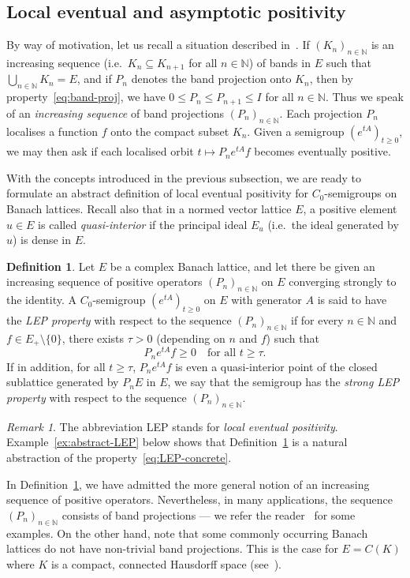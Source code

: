 \documentclass[a4paper, reqno]{amsart}
\numberwithin{equation}{section}
\theoremstyle{plain}
\theoremstyle{definition}
\newtheorem{definition}[theorem]{Definition}
\theoremstyle{remark}
\newtheorem{remark}[theorem]{Remark}
\newcommand{\NN}{\mathbb{N}}
\begin{document}
\subsection{Local eventual and asymptotic positivity}
By way of motivation, let us recall a situation described in~\cite[Section 7]{Ar21}. If $(K_n)_{n\in\NN}$ is an increasing sequence (i.e.\ $K_n \subseteq K_{n+1}$ for all $n\in\NN$) of bands in $E$ such that $\bigcup_{n\in\NN}K_n = E$, and if $P_n$ denotes the band projection onto $K_n$, then by property~\eqref{eq:band-proj}, we have $0\le P_n \le P_{n+1} \le I$ for all $n\in\NN$. Thus we speak of an \emph{increasing sequence} of band projections $(P_n)_{n\in\NN}$. Each projection $P_n$ localises a function $f$ onto the compact subset $K_n$. Given a semigroup $(e^{tA})_{t\ge 0}$, we may then ask if each localised orbit $t\mapsto P_n e^{tA}f$ becomes eventually positive.

With the concepts introduced in the previous subsection, we are ready to formulate an abstract definition of local eventual positivity for $C_0$-semigroups on Banach lattices. Recall also that in a normed vector lattice $E$, a positive element $u\in E$ is called \emph{quasi-interior} if the principal ideal $E_u$ (i.e.\ the ideal generated by $u$) is dense in $E$. 
\begin{definition}
\label{def:abstract-LEP}
	Let $E$ be a complex Banach lattice, and let there be given an increasing sequence of positive operators $(P_n)_{n\in\NN}$ on $E$ converging strongly to the identity. A $C_0$-semigroup $(e^{tA})_{t\ge 0}$ on $E$ with generator $A$ is said to have the \emph{LEP property} with respect to the sequence $(P_n)_{n\in\NN}$ if for every $n\in\NN$ and $f\in E_+\setminus\{0\}$, there exists $\tau>0$ (depending on $n$ and $f$) such that
	\begin{equation}
		\label{eq:LEP}\tag{LEP}
		P_n e^{tA}f \ge 0 \quad\text{for all } t\ge\tau.
	\end{equation}
	If in addition, for all $t\ge\tau$, $P_n e^{tA}f$ is even a quasi-interior point of the closed sublattice generated by $P_n E$ in $E$, we say that the semigroup has the \emph{strong LEP property} with respect to the sequence $(P_n)_{n\in\NN}$.
\end{definition}

\begin{remark}
	The abbreviation LEP stands for \emph{local eventual positivity}. Example~\ref{ex:abstract-LEP} below shows that Definition~\ref{def:abstract-LEP} is a natural abstraction of the property~\eqref{eq:LEP-concrete}.
	
	In Definition~\ref{def:abstract-LEP}, we have admitted the more general notion of an increasing sequence of positive operators. Nevertheless, in many applications, the sequence $(P_n)_{n\in\NN}$ consists of band projections --- we refer the reader~\cite[Section 5]{Ar21} for some examples. On the other hand, note that some commonly occurring Banach lattices do not have non-trivial band projections. This is the case for $E=C(K)$ where $K$ is a compact, connected Hausdorff space (see~\cite[Example 5, p.\ 63]{Sch}).
\end{remark}
\end{document}
